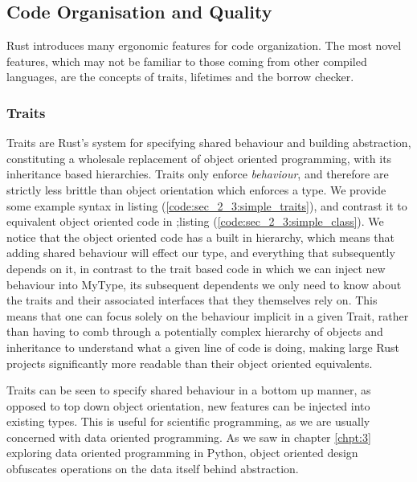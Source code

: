 \subsection*{Code Organisation and Quality}

Rust introduces many ergonomic features for code organization. The most novel features, which may not be familiar to those coming from other compiled languages, are the concepts of traits, lifetimes and the borrow checker.

\subsubsection*{Traits}

Traits are Rust's system for specifying shared behaviour and building abstraction, constituting a wholesale replacement of object oriented programming, with its inheritance based hierarchies. Traits only enforce \textit{behaviour}, and therefore are strictly less brittle than object orientation which enforces a type. We provide some example syntax in listing (\ref{code:sec_2_3:simple_traits}), and contrast it to equivalent object oriented code in ;listing (\ref{code:sec_2_3:simple_class}). We notice that the object oriented code has a built in hierarchy, which means that adding shared behaviour will effect our  type, and everything that subsequently depends on it, in contrast to the trait based code in which we can inject new behaviour into MyType, its subsequent dependents we only need to know about the traits and their associated interfaces that they themselves rely on. This means that one can focus solely on the behaviour implicit in a given Trait, rather than having to comb through a potentially complex hierarchy of objects and inheritance to understand what a given line of code is doing, making large Rust projects significantly more readable than their object oriented equivalents.

Traits can be seen to specify shared behaviour in a bottom up manner, as opposed to top down object orientation, new features can be injected into existing types. This is useful for scientific programming, as we are usually concerned with data oriented programming. As we saw in chapter \ref{chpt:3} exploring data oriented programming in Python, object oriented design obfuscates operations on the data itself behind abstraction.


